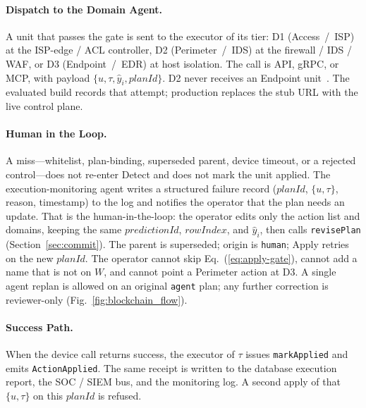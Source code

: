 \documentclass[10pt, conference]{IEEEtran}
\begin{document}
\paragraph{Dispatch to the Domain Agent.}
A unit that passes the gate is sent to the executor of its tier: D1 (Access~/~ISP) at the ISP-edge / ACL controller, D2 (Perimeter~/~IDS) at the firewall / IDS / WAF, or D3 (Endpoint~/~EDR) at host isolation. The call is API, gRPC, or MCP, with payload $\{u,\tau,\hat{y}_i,\mathit{planId}\}$. D2 never receives an Endpoint unit~\cite{chen2024,jin2024}. The evaluated build records that attempt; production replaces the stub URL with the live control plane.

\paragraph{Human in the Loop.}
A miss---whitelist, plan-binding, superseded parent, device timeout, or a rejected control---does not re-enter Detect and does not mark the unit applied. The execution-monitoring agent writes a structured failure record ($\mathit{planId}$, $\{u,\tau\}$, reason, timestamp) to the log and notifies the operator that the plan needs an update. That is the human-in-the-loop: the operator edits only the action list and domains, keeping the same $\mathit{predictionId}$, $\mathit{rowIndex}$, and $\hat{y}_i$, then calls \texttt{revisePlan} (Section~\ref{sec:commit}). The parent is superseded; origin is \texttt{human}; Apply retries on the new $\mathit{planId}$. The operator cannot skip Eq.~(\ref{eq:apply-gate}), cannot add a name that is not on $W$, and cannot point a Perimeter action at D3. A single agent replan is allowed on an original \texttt{agent} plan; any further correction is reviewer-only (Fig.~\ref{fig:blockchain_flow}).

\paragraph{Success Path.}
When the device call returns success, the executor of $\tau$ issues \texttt{markApplied} and emits \texttt{ActionApplied}. The same receipt is written to the database execution report, the SOC / SIEM bus, and the monitoring log. A second apply of that $\{u,\tau\}$ on this $\mathit{planId}$ is refused.
\end{document}

